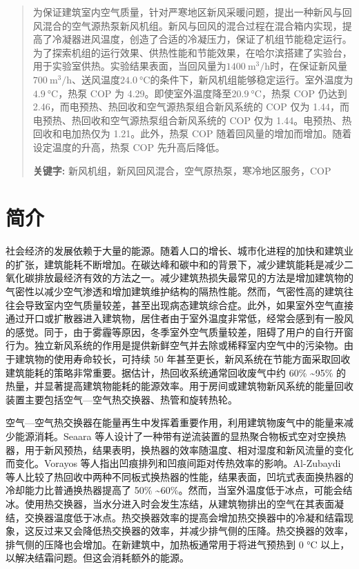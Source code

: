 \begin{abstract}
为保证建筑室内空气质量，针对严寒地区新风采暖问题，提出一种新风与回风混合的空气源热泵新风机组。新风与回风的混合过程在混合箱内实现，提高了冷凝器进风温度，创造了合适的冷凝压力，保证了机组节能稳定运行。为了探索机组的运行效果、供热性能和节能效果，在哈尔滨搭建了实验台，用于实验室供热。实验结果表面，当回风量为$\qty{1400}{\m^3/\hour} $时，在保证新风量$\qty{700}{\m^3/\hour} $、送风温度$\qty{24.0}{\degreeCelsius} $的条件下，新风机组能够稳定运行。室外温度为$\qty{4.9}{\degreeCelsius} $，热泵 COP  为 4.29。即使室外温度降至$\qty{20.9}{\degreeCelsius} $，热泵 COP 仍达到 2.46，而电预热、热回收和空气源热泵组合新风系统的 COP 仅为 1.44，而电预热、热回收和空气源热泵组合新风系统的 COP 仅为 1.44。电预热、热回收和电加热仅为 1.21。此外，热泵 COP 随着回风量的增加而增加。随着设定温度的升高，热泵 COP 先升高后降低。 

\noindent \textbf{关键字:} 新风机组，新风回风混合，空气原热泵，寒冷地区服务，COP
\end{abstract}

\section{简介}
社会经济的发展依赖于大量的能源。随着人口的增长、城市化进程的加快和建筑业的扩张，建筑能耗不断增加。在碳达峰和碳中和的背景下，减少建筑能耗是减少二氧化碳排放最经济有效的方法之一。减少建筑热损失最常见的方法是增加建筑物的气密性以减少空气渗透和增加建筑维护结构的隔热性能。然而，气密性高的建筑往往会导致室内空气质量较差，甚至出现病态建筑综合症。此外，如果室外空气直接通过开口或扩散器进入建筑物，居住者由于室外温度非常低，经常会感到有一股风的感觉。同于，由于雾霾等原因，冬季室外空气质量较差，阻碍了用户的自行开窗行为。独立新风系统的作用是提供新鲜空气并去除或稀释室内空气中的污染物。由于建筑物的使用寿命较长，可持续 50 年甚至更长，新风系统在节能方面采取回收建筑能耗的策略非常重要。据估计，热回收系统通常回收废气中约 60\% \textasciitilde 95\% 的热量，并显著提高建筑物能耗的能源效率。用于房间或建筑物新风系统的能量回收装置主要包括空气---空气热交换器、热管和旋转热轮。

空气---空气热交换器在能量再生中发挥着重要作用，利用建筑物废气中的能量来减少能源消耗。Seaara 等人设计了一种带有逆流装置的显热聚合物板式空对空换热器，用于新风预热，结果表明，换热器的效率随温度、相对湿度和新风流量的变化而变化。Vorayos 等人指出凹痕排列和凹痕间距对传热效率的影响。Al-Zubaydi 等人比较了热回收中两种不同板式换热器的性能，结果表面，凹坑式表面换热器的冷却能力比普通换热器提高了 50\% \textasciitilde 60\%。然而，当室外温度低于冰点，可能会结冰。使用热交换器，当水分进入时会发生冻结，从建筑物排出的空气在其表面凝结，交换器温度低于冰点。热交换器效率的提高会增加热交换器中的冷凝和结霜现象，这反过来又会降低热交换器的效率，并减少排气侧的压降。热交换器的效率，排气侧的压降也会增加。在新建筑中，加热板通常用于将进气预热到 0 °C 以上，以解决结霜问题。但这会消耗额外的能源。

